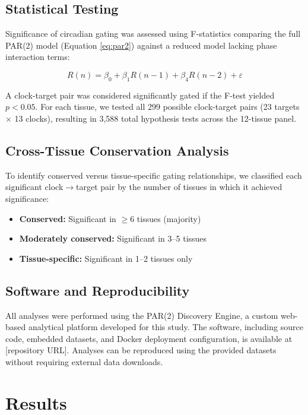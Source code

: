 \documentclass[11pt,letterpaper]{article}
\begin{document}
\subsection{Statistical Testing}

Significance of circadian gating was assessed using F-statistics comparing the full PAR(2) model (Equation \ref{eq:par2}) against a reduced model lacking phase interaction terms:

\begin{equation}
R(n) = \beta_0 + \beta_1 R(n-1) + \beta_4 R(n-2) + \varepsilon
\end{equation}

A clock-target pair was considered significantly gated if the F-test yielded $p < 0.05$. For each tissue, we tested all 299 possible clock-target pairs (23 targets $\times$ 13 clocks), resulting in 3,588 total hypothesis tests across the 12-tissue panel.

\subsection{Cross-Tissue Conservation Analysis}

To identify conserved versus tissue-specific gating relationships, we classified each significant clock$\rightarrow$target pair by the number of tissues in which it achieved significance:
\begin{itemize}[noitemsep]
    \item \textbf{Conserved:} Significant in $\geq$6 tissues (majority)
    \item \textbf{Moderately conserved:} Significant in 3--5 tissues
    \item \textbf{Tissue-specific:} Significant in 1--2 tissues only
\end{itemize}

\subsection{Software and Reproducibility}

All analyses were performed using the PAR(2) Discovery Engine, a custom web-based analytical platform developed for this study. The software, including source code, embedded datasets, and Docker deployment configuration, is available at [repository URL]. Analyses can be reproduced using the provided datasets without requiring external data downloads.

\section{Results}
\end{document}
